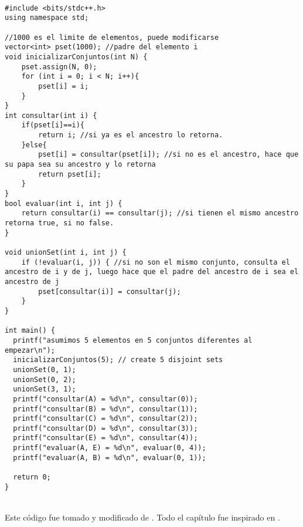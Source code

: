 \\\begin{minipage}{\textwidth}
\begin{lstlisting}[style=C,caption=unionFind.cpp]
#include <bits/stdc++.h>
using namespace std;

//1000 es el limite de elementos, puede modificarse
vector<int> pset(1000); //padre del elemento i
void inicializarConjuntos(int N) {
    pset.assign(N, 0);
    for (int i = 0; i < N; i++){
        pset[i] = i;
    }
}
int consultar(int i) {
    if(pset[i]==i){
        return i; //si ya es el ancestro lo retorna.
    }else{
        pset[i] = consultar(pset[i]); //si no es el ancestro, hace que su papa sea su ancestro y lo retorna
        return pset[i];
    }
}
bool evaluar(int i, int j) {
    return consultar(i) == consultar(j); //si tienen el mismo ancestro retorna true, si no false.
}

void unionSet(int i, int j) {
    if (!evaluar(i, j)) { //si no son el mismo conjunto, consulta el ancestro de i y de j, luego hace que el padre del ancestro de i sea el ancestro de j
        pset[consultar(i)] = consultar(j);
    }
}

int main() {
  printf("asumimos 5 elementos en 5 conjuntos diferentes al empezar\n");
  inicializarConjuntos(5); // create 5 disjoint sets
  unionSet(0, 1);
  unionSet(0, 2);
  unionSet(3, 1);
  printf("consultar(A) = %d\n", consultar(0));
  printf("consultar(B) = %d\n", consultar(1));
  printf("consultar(C) = %d\n", consultar(2));
  printf("consultar(D) = %d\n", consultar(3));
  printf("consultar(E) = %d\n", consultar(4));
  printf("evaluar(A, E) = %d\n", evaluar(0, 4));
  printf("evaluar(A, B) = %d\n", evaluar(0, 1));

  return 0;
}
\end{lstlisting}
\end{minipage}
\\Este código fue tomado y modificado de \cite{disjointSet:Online}. Todo el capítulo fue inspirado en \cite{CompetitiveProgramming3}.
